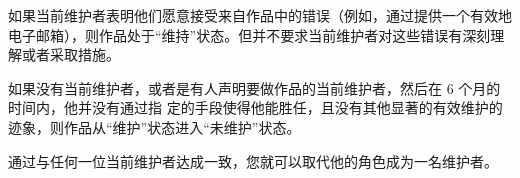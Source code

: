 \begin{LPPLicense}

    如果当前维护者表明他们愿意接受来自作品中的错误（例如，通过提供一个有效地电子邮箱），则作品处于``维持''状态。但并不要求当前维护者对这些错误有深刻理解或者采取措施。


    如果没有当前维护者，或者是有人声明要做作品的当前维护者，然后在 6 个月的时间内，他并没有通过指 定的手段使得他能胜任，且没有其他显著的有效维护的迹象，则作品从``维护''状态进入``未维护''状态。


    通过与任何一位当前维护者达成一致，您就可以取代他的角色成为一名维护者。



\end{LPPLicense}
